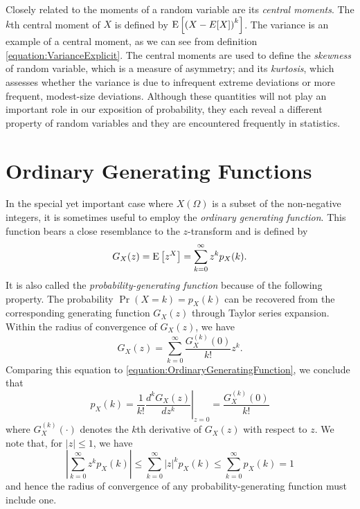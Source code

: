 Closely related to the moments of a random variable are its \emph{central moments}. 
The $k$th central moment of $X$ is defined by $\mathrm{E} \left[ \left( X - E[X] \right)^k \right]$.
The variance is an example of a central moment, as we can see from definition \eqref{equation:VarianceExplicit}.
The central moments are used to define the \emph{skewness} of random variable, which is a measure of asymmetry; and its \emph{kurtosis}, which assesses whether the variance is due to infrequent extreme deviations or more frequent, modest-size deviations.
Although these quantities will not play an important role in our exposition of probability, they each reveal a different property of random variables and they are encountered frequently in statistics. 


\section{Ordinary Generating Functions}
\label{section:OrdinaryGeneratingFunctions}

In the special yet important case where $X(\Omega)$ is a subset of the non-negative integers, it is sometimes useful to employ the \emph{ordinary generating function}. 
This function bears a close resemblance to the $z$-transform and is defined by
\begin{equation} \label{equation:OrdinaryGeneratingFunction}
G_X(z) = \mathrm{E} \left[ z^X \right] = \sum_{k=0}^{\infty} z^k p_X (k) .
\end{equation}
It is also called the \emph{probability-generating function} because of the following property. 
The probability $\Pr (X = k) = p_X(k)$ can be recovered from the corresponding generating function $G_X (z)$ through Taylor series expansion.
Within the radius of convergence of $G_X(z)$, we have
\begin{equation*}
G_X(z) = \sum_{k=0}^{\infty} \frac{G_X^{(k)} (0)}{k!} z^k .
\end{equation*}
Comparing this equation to \eqref{equation:OrdinaryGeneratingFunction}, we conclude that
\begin{equation*}
p_X(k) = \frac{1}{k!} \left. \frac{d^k G_X(z)}{dz^k} \right|_{z=0}
=\frac{G_X^{(k)} (0)}{k!}
\end{equation*}
where $G_X^{(k)} (\cdot)$ denotes the $k$th derivative of $G_X(z)$ with respect to $z$.
We note that, for $|z| \leq 1$, we have
\begin{equation*}
\left| \sum_{k=0}^{\infty} z^k p_X(k) \right|
\leq \sum_{k=0}^{\infty} |z|^k p_X(k)
\leq \sum_{k=0}^{\infty} p_X(k) = 1
\end{equation*}
and hence the radius of convergence of any probability-generating function must include one.

